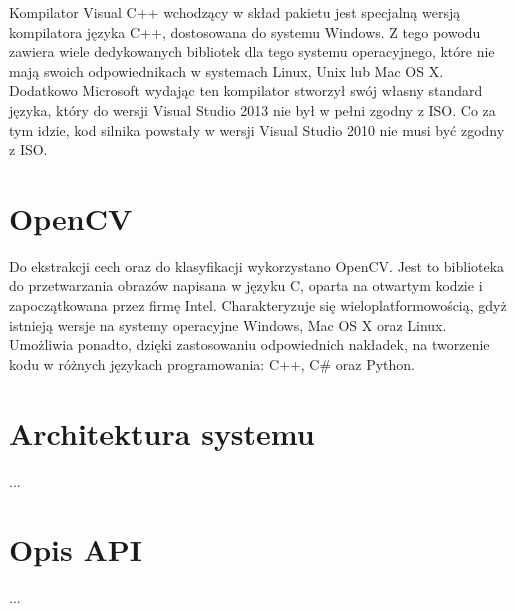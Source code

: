 Kompilator Visual C++ wchodzący w skład pakietu jest specjalną wersją kompilatora języka C++, dostosowana do systemu Windows. Z tego powodu zawiera wiele dedykowanych bibliotek dla tego systemu operacyjnego, które nie mają swoich odpowiednikach w systemach Linux, Unix lub Mac OS X. Dodatkowo Microsoft wydając ten kompilator stworzył swój własny standard języka, który do wersji Visual Studio 2013 nie był w pełni zgodny z ISO. Co za tym idzie, kod silnika powstały w wersji Visual Studio 2010 nie musi być zgodny z ISO.

\section{OpenCV}

Do ekstrakcji cech oraz do klasyfikacji wykorzystano OpenCV. Jest to biblioteka do przetwarzania obrazów napisana w języku C, oparta na otwartym kodzie i zapoczątkowana przez firmę Intel. Charakteryzuje się wieloplatformowością, gdyż istnieją wersje na systemy operacyjne Windows, Mac OS X oraz Linux. Umożliwia ponadto, dzięki zastosowaniu odpowiednich nakładek, na tworzenie kodu w różnych językach programowania: C++, C\# oraz Python.


\section{Architektura systemu}
...

\section{Opis API}
...